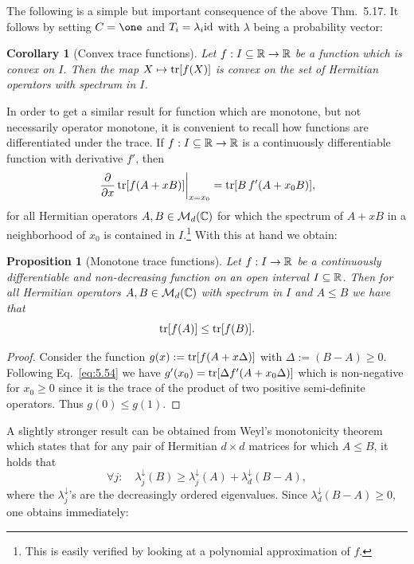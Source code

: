 \documentclass[11pt,a4paper]{article}
\theoremstyle{plain}
\newtheorem{proposition}{Proposition}[section]
\newtheorem{corollary}{Corollary}[section]
\theoremstyle{definition}
\theoremstyle{remark}
\numberwithin{equation}{section}
\begin{document}
The following is a simple but important consequence of the above Thm.~5.17. It
follows by setting $C=\one$ and $T_i=\lambda_i \mathrm{id}$ with $\lambda$ being a probability
vector:

\begin{corollary}[Convex trace functions]
    Let $f:I\subseteq \mathbb{R}\to \mathbb{R}$ be a function which is convex on $I$. Then the map
    $X\mapsto \operatorname{tr}[f(X)]$ is convex on the set of Hermitian operators with spectrum in $I$.
\end{corollary}

In order to get a similar result for function which are monotone, but not necessarily
operator monotone, it is convenient to recall how functions are differentiated under
the trace. If $f:I\subseteq \mathbb{R}\to \mathbb{R}$ is a continuously differentiable function with
derivative $f'$, then
\begin{equation}\label{eq:5.54}
    \left.\frac{\partial}{\partial x}\operatorname{tr}[f(A+xB)]\right|_{x=x_0}
    = \operatorname{tr}[B\, f'(A+x_0 B)],
\end{equation}
for all Hermitian operators $A,B\in \mathcal{M}_d(\mathbb{C})$ for which the spectrum of $A+xB$ in a
neighborhood of $x_0$ is contained in $I$.\footnote{This is easily verified by looking
    at a polynomial approximation of $f$.}
With this at hand we obtain:

\begin{proposition}[Monotone trace functions]
    Let $f:I\to \mathbb{R}$ be a continuously differentiable and non-decreasing function on an
    open interval $I\subseteq \mathbb{R}$. Then for all Hermitian operators $A,B\in \mathcal{M}_d(\mathbb{C})$
    with spectrum in $I$ and $A\le B$ we have that
    \begin{equation}\label{eq:5.55}
        \operatorname{tr}[f(A)] \le \operatorname{tr}[f(B)].
    \end{equation}
\end{proposition}

\begin{proof}
    Consider the function $g(x):=\operatorname{tr}[f(A+x\Delta)]$ with $\Delta:=(B-A)\ge 0$. Following
    Eq.~\eqref{eq:5.54} we have $g'(x_0)=\operatorname{tr}[\Delta f'(A+x_0\Delta)]$ which is non-negative
    for $x_0\ge 0$ since it is the trace of the product of two positive semi-definite
    operators. Thus $g(0)\le g(1)$.
\end{proof}

A slightly stronger result can be obtained from Weyl's monotonicity theorem which
states that for any pair of Hermitian $d\times d$ matrices for which $A\le B$, it
holds that
\begin{equation}\label{eq:5.56}
    \forall j:\quad \lambda^\downarrow_j(B) \ge \lambda^\downarrow_j(A) + \lambda^\downarrow_d(B-A),
\end{equation}
where the $\lambda^\downarrow_j$'s are the decreasingly ordered eigenvalues. Since
$\lambda^\downarrow_d(B-A)\ge 0$, one obtains immediately:
\end{document}
